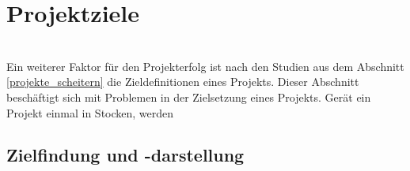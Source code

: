 \documentclass[11pt]{scrartcl}
\begin{document}

\pagebreak
\section{Projektziele}
\ \\
Ein weiterer Faktor für den Projekterfolg ist nach den Studien aus dem Abschnitt \ref{projekte_scheitern} die Zieldefinitionen eines Projekts. Dieser Abschnitt beschäftigt sich mit Problemen in der Zielsetzung eines Projekts. Gerät ein Projekt einmal in Stocken, werden 

\subsection{Zielfindung und -darstellung}
\end{document}
